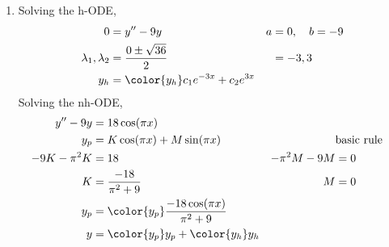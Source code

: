 \begin{enumerate}
    \item Solving the h-ODE,
          \begin{align}
              0                        & = y'' - 9y                               & a & = 0, \quad b = -9 \\
              \lambda_{1}, \lambda_{2} & = \frac{0 \pm \sqrt{36}}{2}              &   & = -3, 3           \\
              y_{h}                    & = \color{y_h} c_{1}e^{-3x} + c_{2}e^{3x}
          \end{align}
          Solving the nh-ODE,
          \begin{align}
              y'' - 9y      & = 18\cos(\pi x)                                                                         \\
              y_{p}         & = K \cos(\pi x) + M \sin(\pi x)                    &                & \text{basic rule} \\
              -9K -\pi^{2}K & = 18                                               & -\pi^{2}M - 9M & = 0               \\
              K             & = \frac{-18}{\pi ^{2} + 9}                         & M              & = 0               \\
              y_{p}         & = \color{y_p} \frac{-18\cos (\pi x)}{\pi ^{2} + 9}                                      \\
              y             & = {\color{y_p} y_{p}} + {\color{y_h} y_{h}}
          \end{align}


\end{enumerate}
